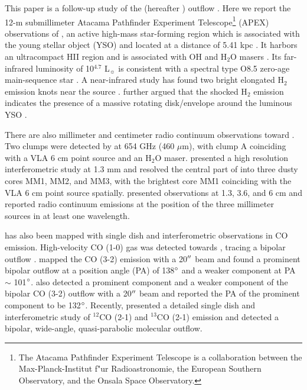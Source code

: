 This paper is a follow-up study of the  (hereafter ) outflow \citep{2009ApJ...696...66Q}. Here we report the 12-m submillimeter Atacama Pathfinder Experiment Telescope\footnote{    The Atacama Pathfinder Experiment Telescope is a collaboration between the Max-Planck-Institut f"ur Radioastronomie, the European Southern Observatory, and the Onsala Space Observatory.} (APEX) observations of , an active high-mass star-forming region which is associated with the young stellar object (YSO)  and located at a distance of 5.41 kpc \citep{2015PASJ...67...69S}. It harbors an ultracompact HII region and is associated with OH and H$_2$O masers \citep{1993AJ....105.1495H,1997MNRAS.289..203C,1998AJ....116.1897M,1999ApJS..123..487M,2003MNRAS.341..551C}. Its far-infrared luminosity of 10$^{4.7}$ L$_\sun$ is consistent with a spectral type O8.5 zero-age main-sequence star \citep{1998AJ....116.1897M}. A near-infrared study has found two bright elongated H$_2$ emission knots near the source \citep{2002ApJ...576..313K}. \citet{2003A&A...412..175K} further argued that the shocked H$_2$ emission indicates the presence of a massive rotating disk/envelope around the luminous YSO . 

There are also millimeter and centimeter radio continuum observations toward . Two clumps were detected by \citet{2007ApJ...654L..87C} at 654 GHz (460 $\mu$m), with clump A coinciding with a VLA 6 cm point source \citep{1993AJ....105.1495H} and an H$_2$O maser. \citet{2009ApJ...696...66Q} presented a high resolution interferometric study at 1.3 mm and resolved the central part of  into three dusty cores MM1, MM2, and MM3, with the brightest core MM1 coinciding with the VLA 6 cm point source spatially. \citet{2011AJ....142..147T} presented observations at 1.3, 3.6, and 6 cm and reported radio continuum emissions at the position of the three millimeter sources in at least one wavelength.

 has also been mapped with single dish and interferometric observations in CO emission. High-velocity CO (1-0) gas was detected towards  \citep{1991AJ....101.1435M,1996ApJ...457..267S}, tracing a bipolar outflow \citep{1996ApJ...457..267S}. \citet{1997PhDT........21H} mapped the CO (3-2) emission with a 20${\mbox{$^{\prime\prime}$}}$ beam and found a prominent bipolar outflow at a position angle (PA) of 138${\mbox{$^\circ$}}$ and a weaker component at PA $\sim$ 101${\mbox{$^\circ$}}$. \citet{2003A&A...412..175K} also detected a prominent component and a weaker component of the bipolar CO (3-2) outflow with a 20${\mbox{$^{\prime\prime}$}}$ beam and reported the PA of the prominent component to be 132${\mbox{$^\circ$}}$. Recently, \citet{2009ApJ...696...66Q} presented a detailed single dish and interferometric study of $^{12}$CO (2-1) and $^{13}$CO (2-1) emission and detected a bipolar, wide-angle, quasi-parabolic molecular outflow. 

